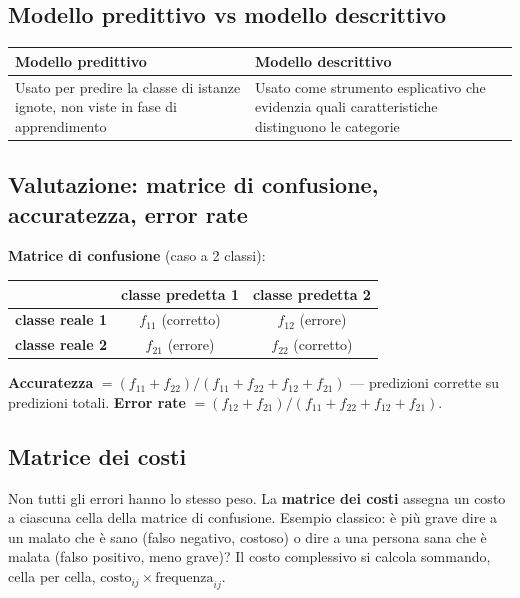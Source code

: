\documentclass[11pt,a4paper]{report}
\begin{document}
\subsection*{Modello predittivo vs modello descrittivo}

\begin{center}
\begin{tabular}{@{}p{5.3cm}p{5.3cm}@{}}
\toprule
\textbf{Modello predittivo} & \textbf{Modello descrittivo} \\
\midrule
Usato per predire la classe di istanze ignote, non viste in fase di apprendimento & Usato come strumento esplicativo che evidenzia quali caratteristiche distinguono le categorie \\
\bottomrule
\end{tabular}
\end{center}

\subsection*{Valutazione: matrice di confusione, accuratezza, error rate}

\textbf{Matrice di confusione} (caso a 2 classi):

\begin{center}
\begin{tabular}{@{}lcc@{}}
\toprule
 & \textbf{classe predetta 1} & \textbf{classe predetta 2} \\
\midrule
\textbf{classe reale 1} & $f_{11}$ (corretto) & $f_{12}$ (errore) \\
\textbf{classe reale 2} & $f_{21}$ (errore) & $f_{22}$ (corretto) \\
\bottomrule
\end{tabular}
\end{center}

\textbf{Accuratezza} $= (f_{11}+f_{22})/(f_{11}+f_{22}+f_{12}+f_{21})$ --- predizioni corrette su predizioni totali. \textbf{Error rate} $= (f_{12}+f_{21})/(f_{11}+f_{22}+f_{12}+f_{21})$.

\subsection*{Matrice dei costi}

Non tutti gli errori hanno lo stesso peso. La \textbf{matrice dei costi} assegna un costo a ciascuna cella della matrice di confusione. Esempio classico: è più grave dire a un malato che è sano (falso negativo, costoso) o dire a una persona sana che è malata (falso positivo, meno grave)? Il costo complessivo si calcola sommando, cella per cella, $\text{costo}_{ij} \times \text{frequenza}_{ij}$.
\end{document}
